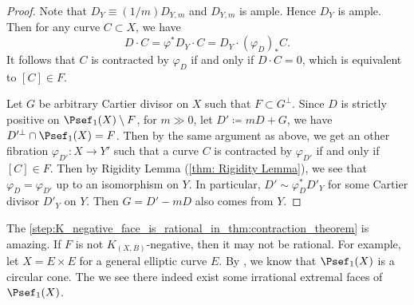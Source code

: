 \begin{proof}
        Note that \(D_Y \equiv (1/m) D_{Y,m}\) and \(D_{Y,m}\) is ample.
        Hence \(D_Y\) is ample.
        Then for any curve \(C \subset X\), we have
        \[ D \cdot C = \varphi^* D_Y \cdot C = D_Y \cdot (\varphi_D)_* C. \]
        It follows that \(C\) is contracted by \(\varphi_D\) if and only if \(D \cdot C = 0\), which is equivalent to \([C] \in F\).
        
        Let \(G\) be arbitrary Cartier divisor on \(X\) such that \(F \subset G^\perp\).
        Since \(D\) is strictly positive on \(\Psef_1(X) \setminus F\), for \(m \gg 0\), let \(D'\coloneqq mD+G\), we have \(D'^\perp \cap \Psef_1(X) = F\).
        Then by the same argument as above, we get an other fibration \(\varphi_{D'}: X \to Y'\) such that a curve \(C\) is contracted by \(\varphi_{D'}\) if and only if \([C] \in F\).
        Then by Rigidity Lemma (\cref{thm: Rigidity Lemma}), we see that \(\varphi_D = \varphi_{D'}\) up to an isomorphism on \(Y\).
        In particular, \(D' \sim \varphi_D^* D'_Y\) for some Cartier divisor \(D'_Y\) on \(Y\).
        Then \(G = D' - mD\) also comes from \(Y\).
    \end{proof}
    \begin{remark}\label{rmk_K_negative_face_is_rational}
        The \cref{step:K_negative_face_is_rational_in_thm:contraction_theorem} is amazing.
        If \(F\) is not \(K_{(X,B)}\)-negative, then it may not be rational.
        For example, let \(X = E \times E\) for a general elliptic curve \(E\).
        By \cite[Lemma 1.5.4]{Laz04a}, we know that \(\Psef_1(X)\) is a circular cone.
        The we see there indeed exist some irrational extremal faces of \(\Psef_1(X)\).
    \end{remark}

